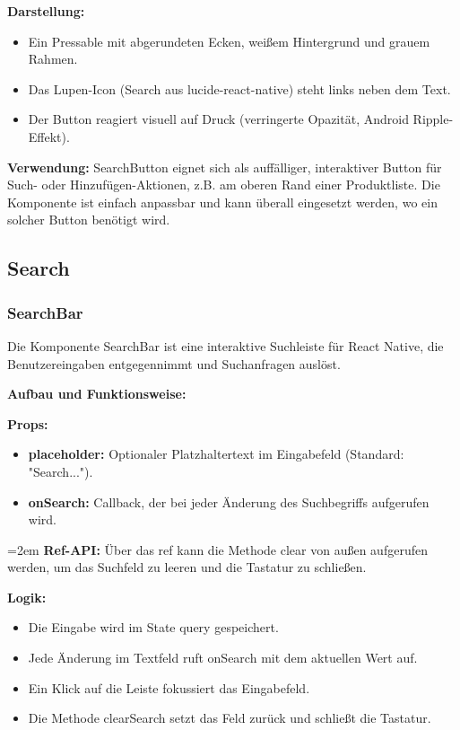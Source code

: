 \documentclass[12pt, a4paper]{report} %
\begin{document}
\textbf{Darstellung:}
\begin{itemize}
    \item Ein Pressable mit abgerundeten Ecken, weißem Hintergrund und grauem Rahmen.
    \item Das Lupen-Icon (Search aus lucide-react-native) steht links neben dem Text.
    \item Der Button reagiert visuell auf Druck (verringerte Opazität, Android Ripple-Effekt).
\end{itemize}

\noindent\textbf{Verwendung:} SearchButton eignet sich als auffälliger, interaktiver Button für Such- oder Hinzufügen-Aktionen, z.B. am oberen Rand einer Produktliste. Die Komponente ist einfach anpassbar und kann überall eingesetzt werden, wo ein solcher Button benötigt wird.

\subsection{Search}

\subsubsection{SearchBar}
Die Komponente SearchBar ist eine interaktive Suchleiste für React Native, die Benutzereingaben entgegennimmt und Suchanfragen auslöst.

\noindent\textbf{Aufbau und Funktionsweise:}

\textbf{Props:}
\begin{itemize}
    \item \textbf{placeholder:} Optionaler Platzhaltertext im Eingabefeld (Standard: "Search...").
    \item \textbf{onSearch:} Callback, der bei jeder Änderung des Suchbegriffs aufgerufen wird.
\end{itemize}

\hangindent=2em
\textbf{Ref-API:}
Über das ref kann die Methode clear von außen aufgerufen werden, um das Suchfeld zu leeren und die Tastatur zu schließen.

\textbf{Logik:}
\begin{itemize}
    \item Die Eingabe wird im State query gespeichert.
    \item Jede Änderung im Textfeld ruft onSearch mit dem aktuellen Wert auf.
    \item Ein Klick auf die Leiste fokussiert das Eingabefeld.
    \item Die Methode clearSearch setzt das Feld zurück und schließt die Tastatur.
\end{itemize}
\end{document}
